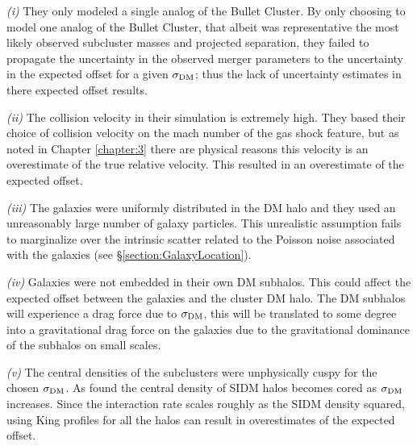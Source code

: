 \textit{(i)} They only modeled a single analog of the Bullet Cluster. 
By only choosing to model one analog of the Bullet Cluster, that albeit was representative the most likely observed subcluster masses and projected separation, they failed to propagate the uncertainty in the observed merger parameters to the uncertainty in the expected offset for a given $\sigma_{\rm DM}$; thus the lack of uncertainty estimates in there expected offset results.

\textit{(ii)} The collision velocity in their simulation is extremely high.
They based their choice of collision velocity on the mach number of the gas shock feature, but as noted in Chapter \ref{chapter:3} there are physical reasons this velocity is an overestimate of the true relative velocity.
This resulted in an overestimate of the expected offset.
	
\textit{(iii)} The galaxies were uniformly distributed in the DM halo and they used an unreasonably large number of galaxy particles. 
This unrealistic assumption fails to marginalize over the intrinsic scatter related to the Poisson noise associated with the galaxies (see \S\ref{section:GalaxyLocation}).

\textit{(iv)} Galaxies were not embedded in their own DM subhalos.
This could affect the expected offset between the galaxies and the cluster DM halo. The DM subhalos will experience a drag force due to  $\sigma_{\rm DM}$, this will be translated to some degree into a gravitational drag force on the galaxies due to the gravitational dominance of the subhalos on small scales. 

\textit{(v)} The central densities of the subclusters were unphysically cuspy for the chosen $\sigma_{\rm DM}$.
As \citet{Rocha:2012tr} found the central density of SIDM halos becomes cored as $\sigma_{\rm DM}$ increases.
Since the interaction rate scales roughly as the SIDM density squared, using King profiles for all the halos can result in overestimates of the expected offset. 

